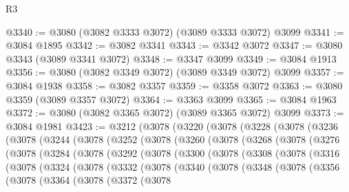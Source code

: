 \begin{lexlean}{R3}
\begin{coremodule}
@3340 := @3080 (@3082 @3333 @3072) (@3089 @3333 @3072) @3099
@3341 := @3084 @1895
@3342 := @3082 @3341
@3343 := @3342 @3072
@3347 := @3080 @3343 (@3089 @3341 @3072)
@3348 := @3347 @3099
@3349 := @3084 @1913
@3356 := @3080 (@3082 @3349 @3072) (@3089 @3349 @3072) @3099
@3357 := @3084 @1938
@3358 := @3082 @3357
@3359 := @3358 @3072
@3363 := @3080 @3359 (@3089 @3357 @3072)
@3364 := @3363 @3099
@3365 := @3084 @1963
@3372 := @3080 (@3082 @3365 @3072) (@3089 @3365 @3072) @3099
@3373 := @3084 @1981
@3423 := @3212
    (@3078
      (@3220
        (@3078
          (@3228
            (@3078
              (@3236
                (@3078
                  (@3244
                    (@3078
                      (@3252
                        (@3078
                          (@3260
                            (@3078
                              (@3268
                                (@3078
                                  (@3276
                                    (@3078
                                      (@3284
                                        (@3078
                                          (@3292
                                            (@3078
                                              (@3300
                                                (@3078
                                                  (@3308
                                                    (@3078
                                                      (@3316
                                                        (@3078
                                                          (@3324
                                                            (@3078
                                                              (@3332
                                                                (@3078
                                                                  (@3340
                                                                    (@3078
                                                                      (@3348
                                                                        (@3078
                                                                          (@3356
                                                                            (@3078
                                                                              (@3364
                                                                                (@3078
                                                                                  (@3372
                                                                                    (@3078

\end{coremodule}
\end{lexlean}
